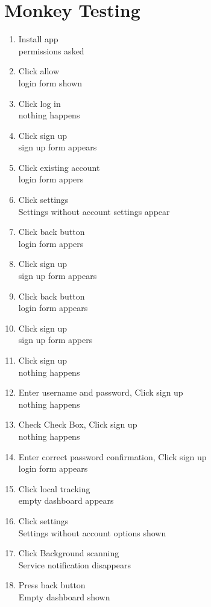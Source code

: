 \chapter{Monkey Testing}
\begin{enumerate}
\item Install app \\ permissions asked
\item Click allow \\ login form shown
\item Click log in \\ nothing happens
\item Click sign up \\ sign up form appears
\item Click existing account \\ login form appers
\item Click settings \\ Settings without account settings appear
\item Click back button \\ login form appers
\item Click sign up \\ sign up form appears
\item Click back button \\ login form appears
\item Click sign up \\ sign up form appers
\item Click sign up \\ nothing happens
\item Enter username and password, Click sign up \\ nothing happens
\item Check Check Box, Click sign up \\ nothing happens
\item Enter correct password confirmation, Click sign up \\ login form appears
\item Click local tracking \\ empty dashboard appears
\item Click settings \\ Settings without account options shown
\item Click Background scanning \\ Service notification disappears
\item Press back button \\ Empty dashboard shown

\end{enumerate}
